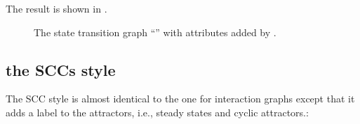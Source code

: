 \documentclass[letterpaper,10pt,english]{sphinxmanual}
\begin{document}
\begin{sphinxVerbatim}[commandchars=\\\{\}]
  \PYG{p}{[}\PYG{p}{]}
  
 
\end{sphinxVerbatim}

The result is shown in {\hyperref[\detokenize{Manual:figure12}]{}}.

\begin{figure}[htbp]
\centering
\capstart

\noindent{}
\caption{The state transition graph “” with attributes added by {\hyperref[\detokenize{InteractionGraphs:add-style-path}]{}}.}\label{\detokenize{Manual:figure12}}\label{\detokenize{Manual:id16}}\end{figure}


\subsection{the SCCs style}
\label{\detokenize{Manual:id4}}
The SCC style is almost identical to the one for interaction graphs except that it adds a label to the attractors, i.e.,
steady states and cyclic attractors.:
\end{document}

